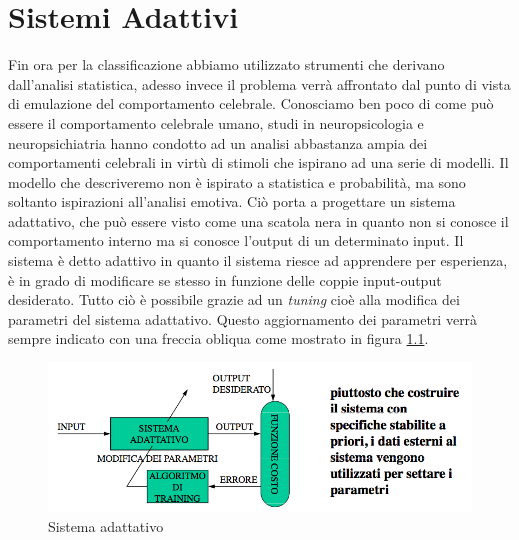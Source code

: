 %
%
%

\chapter{Sistemi Adattivi}
Fin ora per la classificazione abbiamo utilizzato strumenti che derivano dall'analisi statistica, adesso invece il problema verrà affrontato dal punto di vista di emulazione del comportamento celebrale. Conosciamo ben poco di come può essere il comportamento celebrale umano, studi in neuropsicologia e neuropsichiatria hanno condotto ad un analisi abbastanza ampia dei comportamenti celebrali in virtù di stimoli che ispirano ad una serie di modelli. Il modello che descriveremo non è ispirato a statistica e probabilità, ma sono soltanto ispirazioni all'analisi emotiva. Ciò porta a progettare un sistema adattativo, che può essere visto come una scatola nera in quanto non si conosce il comportamento interno ma si conosce l'output di un determinato input. Il sistema è detto adattivo in quanto il sistema riesce ad apprendere per esperienza, è in grado di modificare se stesso in funzione delle coppie input-output desiderato. Tutto ciò è possibile grazie ad un \emph{tuning} cioè alla modifica dei parametri del sistema adattativo. Questo aggiornamento dei parametri verrà sempre indicato con una freccia obliqua come mostrato in figura \ref{sa}.
\begin{figure}
\centering
\includegraphics[scale=0.5]{img/sistema_adattativo.png}
\caption{Sistema adattativo}
\label{sa}
\end{figure}
